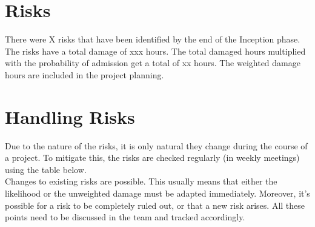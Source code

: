 \section{Risks}
There were X risks that have been identified by the end of the Inception phase. 
The risks have a total damage of xxx hours. The total damaged hours multiplied 
with the probability of admission get a total of xx hours. The weighted damage 
hours are included in the project planning.

\section{Handling Risks}
Due to the nature of the risks, it is only natural they change during the course of a project. 
To mitigate this, the risks are checked regularly (in weekly meetings) using the table below.
\\
Changes to existing risks are possible. This usually means that either the likelihood or 
the unweighted damage must be adapted immediately. Moreover, it's possible for a risk to 
be completely ruled out, or that a new risk arises. All these points need to be discussed in 
the team and tracked accordingly.

